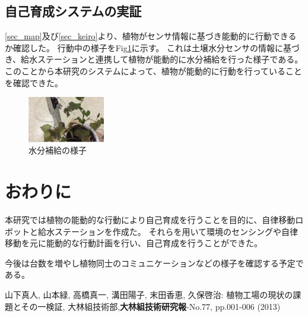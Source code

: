 \documentclass[10pt]{jsarticle}
\begin{document}
\subsection{自己育成システムの実証}
\ref{sec_map}及び\ref{sec_keiro}より、植物がセンサ情報に基づき能動的に行動できるか確認した。
行動中の様子をFig\ref{mizu}に示す。
これは土壌水分センサの情報に基づき、給水ステーションと連携して植物が能動的に水分補給を行った様子である。
このことから本研究のシステムによって、植物が能動的に行動を行っていることを確認できた。
\begin{figure}[t]
    \centering
    \includegraphics[width=0.3\textwidth]{img/mizu.png}
    \caption{水分補給の様子}
    \label{mizu}
\end{figure}

\section{おわりに}
本研究では植物の能動的な行動により自己育成を行うことを目的に、自律移動ロボットと給水ステーションを作成た。
それらを用いて環境のセンシングや自律移動を元に能動的な行動計画を行い、自己育成を行うことができた。

今後は台数を増やし植物同士のコミュニケーションなどの様子を確認する予定である。

\begin{thebibliography}{10}

山下真人, 山本緑, 高橋真一, 溝田陽子, 末田香恵, 久保啓治: 植物工場の現状の課題とその一検証,
大林組技術部,{\bf 大林組技術研究報}-No.77, pp.001-006 (2013)
\end{thebibliography}
\end{document}
